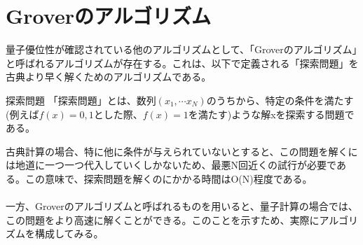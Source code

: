 \documentclass[a4paper,10.5pt]{article}
\numberwithin{equation}{section}
\begin{document}
\section{Groverのアルゴリズム}
量子優位性が確認されている他のアルゴリズムとして、「Groverのアルゴリズム」と呼ばれるアルゴリズムが存在する。これは、以下で定義される「探索問題」を古典より早く解くためのアルゴリズムである。
\begin{defbox}{探索問題}
    「探索問題」とは、数列$(x_{1},\cdots x_{N})$のうちから、特定の条件を満たす(例えば$f(x)=0,1$とした際、$f(x)=1$を満たす)ような解xを探索する問題である。
\end{defbox}
古典計算の場合、特に他に条件が与えられていないとすると、この問題を解くには地道に一つ一つ代入していくしかないため、最悪N回近くの試行が必要である。この意味で、探索問題を解くのにかかる時間はO(N)程度である。\\
\\
一方、Groverのアルゴリズムと呼ばれるものを用いると、量子計算の場合では、この問題をより高速に解くことができる。このことを示すため、実際にアルゴリズムを構成してみる。\\
\end{document}

